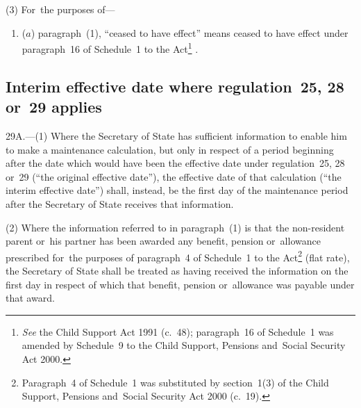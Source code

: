 \documentclass[12pt,a4paper]{article}
\begin{document}
(3) For~the purposes of—
\begin{enumerate}\item[]
($a$) paragraph~(1), “ceased to have effect” means ceased to have effect under paragraph~16 of Schedule~1 to the Act\footnote{\emph{See} the Child Support Act 1991 (c.\ 48); paragraph~16 of Schedule~1 was amended by Schedule~9 to the Child Support, Pensions and~Social Security Act 2000.}%
%
.
\end{enumerate}


\subsection[29A. Interim effective date where regulation~25, 28 or~29 applies]{Interim effective date where regulation~25, 28 or~29 applies}

29A.---(1)  Where the Secretary of State has sufficient information to enable him to make a maintenance calculation, but only in respect of a period beginning after the date which would have been the effective date under regulation~25, 28 or~29 (“the original effective date”), the effective date of that calculation (“the interim effective date”) shall, instead, be the first day of the maintenance period after the Secretary of State receives that information.

(2) Where the information referred to in paragraph~(1) is that the non-resident parent or~his partner has been awarded any benefit, pension or~allowance prescribed for~the purposes of paragraph~4 of Schedule~1 to the Act\footnote{Paragraph~4 of Schedule~1 was substituted by section~1(3) of the Child Support, Pensions and~Social Security Act 2000 (c.\ 19).} (flat rate), the Secretary of State shall be treated as having received the information on the first day in respect of which that benefit, pension or~allowance was payable under that award.
\end{document}
